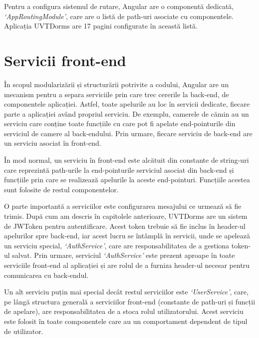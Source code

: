 \documentclass[12pt,a4paper]{report}
\theoremstyle{definition}
\theoremstyle{remark}
\begin{document}
\par Pentru a configura sistemul de rutare, Angular are o componentă dedicată, \textit{`AppRoutingModule'}, care are o listă de path-uri asociate cu componentele. Aplicația UVTDorms are 17 pagini configurate în această listă.

\section{Servicii front-end}

\par În scopul modularizării și structurării potrivite a codului, Angular are un mecanism pentru a separa serviciile prin care trec cererile la back-end, de componentele aplicației. Astfel, toate apelurile au loc în servicii dedicate, fiecare parte a aplicației având propriul serviciu. De exemplu, camerele de cămin au un serviciu care conține toate funcțiile cu care pot fi apelate end-pointurile din serviciul de camere al back-endului. Prin urmare, fiecare serviciu de back-end are un serviciu asociat în front-end.

\par În mod normal, un serviciu în front-end este alcătuit din constante de string-uri care reprezintă path-urile la end-pointurile serviciul asociat din back-end și funcțiile prin care se realizează apelurile la aceste end-pointuri. Funcțiile acestea sunt folosite de restul componentelor.

\par O parte importantă a serviciilor este configurarea mesajului ce urmează să fie trimis. După cum am descris în capitolele anterioare, UVTDorms are un sistem de JWToken pentru autentificare. Acest token trebuie să fie inclus în header-ul apelurilor spre back-end, iar acest lucru se întâmplă în servicii, unde se apelează un serviciu special, \textit{`AuthService'}, care are responsabilitatea de a gestiona token-ul salvat. Prin urmare, serviciul \textit{`AuthService'} este prezent aproape în toate serviciile front-end al aplicației și are rolul de a furniza header-ul necesar pentru comunicarea cu back-endul.

\par Un alt serviciu puțin mai special decât restul serviciilor este \textit{`UserService'}, care, pe lângă structura generală a serviciilor front-end (constante de path-uri și funcții de apelare), are responsabilitatea de a stoca rolul utilizatorului. Acest serviciu este folosit în toate componentele care au un comportament dependent de tipul de utilizator.
\end{document}
